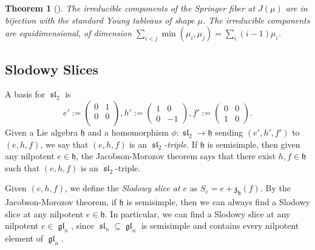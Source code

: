 \documentclass[12pt,psamsfonts]{article}
\DeclareMathOperator{\gl}{\mathfrak{gl}}
\DeclareMathOperator{\spl}{\mathfrak{sl}}
\newtheorem{theorem}{Theorem}[section]
\begin{document}
\begin{theorem}[{\cite[2.1]{springer_fiber}}]\label{usual_springer_fiber}
    The irreducible components of the Springer fiber at \(J(\mu)\) are in bijection with the standard Young tableaus of shape \(\mu\).
    The irreducible components are equidimensional, of dimension \(\sum_{i < j} \min(\mu_i, \mu_j) = \sum_i (i - 1) \mu_i\).
\end{theorem}

\subsection{Slodowy Slices}
A basis for \(\spl_2\) is
\[e' := \begin{pmatrix}0 & 1 \\ 0 & 0 \\\end{pmatrix}, h' := \begin{pmatrix}1 & 0 \\0 & -1\end{pmatrix}, f' := \begin{pmatrix}0 & 0 \\1 & 0\end{pmatrix}.\]
Given a Lie algebra \(\mathfrak{h}\) and a homomorphism \(\phi : \spl_2 \to \mathfrak{h}\) sending \((e', h', f')\) to \((e, h, f)\), we say that \((e, h, f)\) is an \emph{\(\spl_2\)-triple}.
If \(\mathfrak{h}\) is semisimple, then given any nilpotent \(e \in \mathfrak{h}\), the Jacobson-Morozov theorem \cite[3.7.1]{ehf} says that there exist \(h, f \in \mathfrak{h}\) such that \((e, h, f)\) is an \(\spl_2\)-triple.
\par Given \((e, h, f)\), we define the \emph{Slodowy slice at \(e\)} as \(S_e = e + \mathfrak{z}_\mathfrak{h}(f)\).
By the Jacobson-Morozov theorem, if \(\mathfrak{h}\) is semisimple, then we can always find a Slodowy slice at any nilpotent \(e \in \mathfrak{h}\).
In particular, we can find a Slodowy slice at any nilpotent \(e \in \gl_n\), since \(\spl_n \subseteq \gl_n\) is semisimple and contains every nilpotent element of \(\gl_n\).
\end{document}
